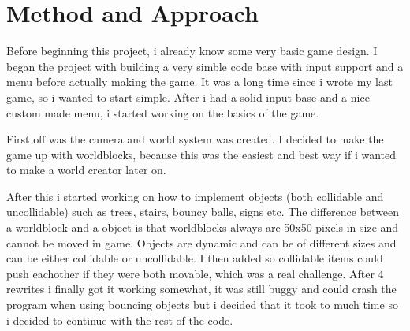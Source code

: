 \documentclass[a4paper,12pt]{article}
\begin{document}
\section{Method and Approach}

Before beginning this project, i already know some very basic game design.
I began the project with building a very simble code base with input support and a menu before actually making the game.
It was a long time since i wrote my last game, so i wanted to start simple.
After i had a solid input base and a nice custom made menu, i started working on the basics of the game.

First off was the camera and world system was created. 
I decided to make the game up with worldblocks, because this was the easiest and best way if i wanted to make a world creator later on.

After this i started working on how to implement objects (both collidable and uncollidable) such as trees, stairs, bouncy balls, signs etc.
The difference between a worldblock and a object is that worldblocks always are 50x50 pixels in size and cannot be moved in game.
Objects are dynamic and can be of different sizes and can be either collidable or uncollidable. 
I then added so collidable items could push eachother if they were both movable, which was a real challenge.
After 4 rewrites i finally got it working somewhat, it was still buggy and could crash the program when using bouncing objects but i decided that it took to much time so i decided to continue with the rest of the code.
\end{document}
